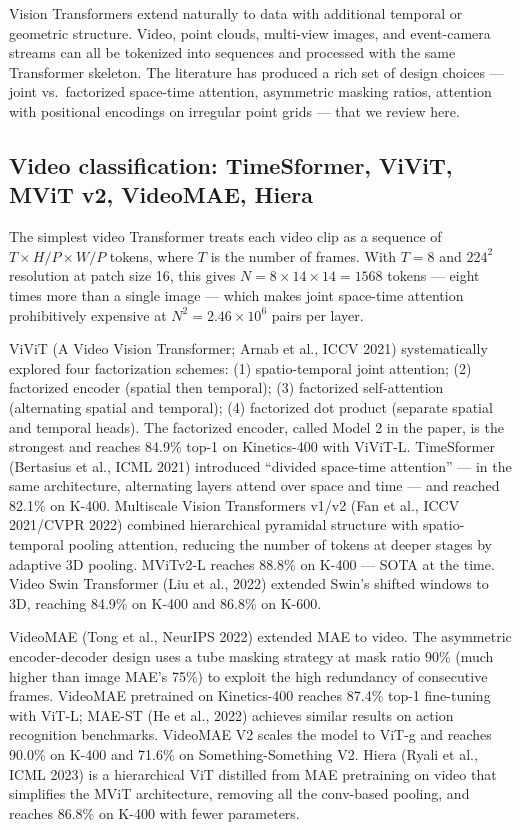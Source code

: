 Vision Transformers extend naturally to data with additional temporal or geometric structure. Video, point clouds, multi-view images, and event-camera streams can all be tokenized into sequences and processed with the same Transformer skeleton. The literature has produced a rich set of design choices --- joint vs.~factorized space-time attention, asymmetric masking ratios, attention with positional encodings on irregular point grids --- that we review here.

\subsection{Video classification: TimeSformer, ViViT, MViT v2, VideoMAE, Hiera}\label{video-classification-timesformer-vivit-mvit-v2-videomae-hiera}

The simplest video Transformer treats each video clip as a sequence of \(T \times H/P \times W/P\) tokens, where \(T\) is the number of frames. With \(T=8\) and \(224^2\) resolution at patch size 16, this gives \(N = 8 \times 14 \times 14 = 1568\) tokens --- eight times more than a single image --- which makes joint space-time attention prohibitively expensive at \(N^2 = 2.46\times 10^6\) pairs per layer.

ViViT (A Video Vision Transformer; Arnab et al., ICCV 2021) systematically explored four factorization schemes: (1) spatio-temporal joint attention; (2) factorized encoder (spatial then temporal); (3) factorized self-attention (alternating spatial and temporal); (4) factorized dot product (separate spatial and temporal heads). The factorized encoder, called Model 2 in the paper, is the strongest and reaches 84.9\% top-1 on Kinetics-400 with ViViT-L. TimeSformer (Bertasius et al., ICML 2021) introduced ``divided space-time attention'' --- in the same architecture, alternating layers attend over space and time --- and reached 82.1\% on K-400. Multiscale Vision Transformers v1/v2 (Fan et al., ICCV 2021/CVPR 2022) combined hierarchical pyramidal structure with spatio-temporal pooling attention, reducing the number of tokens at deeper stages by adaptive 3D pooling. MViTv2-L reaches 88.8\% on K-400 --- SOTA at the time. Video Swin Transformer (Liu et al., 2022) extended Swin's shifted windows to 3D, reaching 84.9\% on K-400 and 86.8\% on K-600.

VideoMAE (Tong et al., NeurIPS 2022) extended MAE to video. The asymmetric encoder-decoder design uses a tube masking strategy at mask ratio 90\% (much higher than image MAE's 75\%) to exploit the high redundancy of consecutive frames. VideoMAE pretrained on Kinetics-400 reaches 87.4\% top-1 fine-tuning with ViT-L; MAE-ST (He et al., 2022) achieves similar results on action recognition benchmarks. VideoMAE V2 scales the model to ViT-g and reaches 90.0\% on K-400 and 71.6\% on Something-Something V2. Hiera (Ryali et al., ICML 2023) is a hierarchical ViT distilled from MAE pretraining on video that simplifies the MViT architecture, removing all the conv-based pooling, and reaches 86.8\% on K-400 with fewer parameters.

